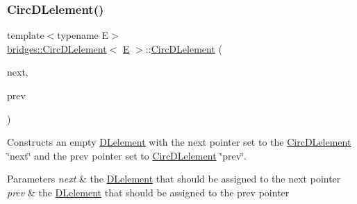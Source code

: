 \subsubsection{\texorpdfstring{CircDLelement()}{CircDLelement()}\hspace{0.1cm}{\footnotesize\ttfamily [3/4]}}
{\footnotesize\ttfamily template$<$typename E$>$ \\
\mbox{\hyperlink{classbridges_1_1_circ_d_lelement}{bridges\+::\+Circ\+D\+Lelement}}$<$ \mbox{\hyperlink{namespacebridges_acfb0a4f7877d8f63de3e6862004c50eda3a3ea00cfc35332cedf6e5e9a32e94da}{E}} $>$\+::\mbox{\hyperlink{classbridges_1_1_circ_d_lelement}{Circ\+D\+Lelement}} (\begin{DoxyParamCaption}\item[{\mbox{\hyperlink{classbridges_1_1_circ_d_lelement}{Circ\+D\+Lelement}}$<$ \mbox{\hyperlink{namespacebridges_acfb0a4f7877d8f63de3e6862004c50eda3a3ea00cfc35332cedf6e5e9a32e94da}{E}} $>$}]{next,  }\item[{\mbox{\hyperlink{classbridges_1_1_circ_d_lelement}{Circ\+D\+Lelement}}$<$ \mbox{\hyperlink{namespacebridges_acfb0a4f7877d8f63de3e6862004c50eda3a3ea00cfc35332cedf6e5e9a32e94da}{E}} $>$}]{prev }\end{DoxyParamCaption})\hspace{0.3cm}{\ttfamily [inline]}}

Constructs an empty \mbox{\hyperlink{classbridges_1_1_d_lelement}{D\+Lelement}} with the next pointer set to the \mbox{\hyperlink{classbridges_1_1_circ_d_lelement}{Circ\+D\+Lelement}} \char`\"{}next\char`\"{} and the prev pointer set to \mbox{\hyperlink{classbridges_1_1_circ_d_lelement}{Circ\+D\+Lelement}} \char`\"{}prev\char`\"{}.


\begin{DoxyParams}{Parameters}
{\em next} & the \mbox{\hyperlink{classbridges_1_1_d_lelement}{D\+Lelement}} that should be assigned to the next pointer \\
\hline
{\em prev} & the \mbox{\hyperlink{classbridges_1_1_d_lelement}{D\+Lelement}} that should be assigned to the prev pointer \\
\hline
\end{DoxyParams}
\mbox{\label{classbridges_1_1_circ_d_lelement_a2e729cd481f11c51bb5b686b8072ec8c}} 

